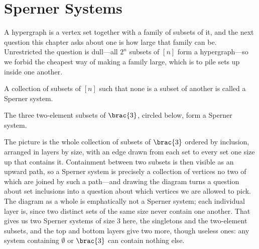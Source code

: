 \section{Sperner Systems}

A hypergraph is a vertex set together with a family of subsets of it, and the next question this chapter asks about one is how large that family can be. Unrestricted the question is dull---all $2^n$ subsets of $[n]$ form a hypergraph---so we forbid the cheapest way of making a family large, which is to pile sets up inside one another.

\begin{boxdefinition}
    A collection of subsets of $[n]$ such that none is a subset of another is called a Sperner system.
\end{boxdefinition}

\begin{boxexample}
    The three two-element subsets of $\brac{3}$, circled below, form a Sperner system.
\end{boxexample}

\begin{figure}[H]
    \centering
\end{figure}

The picture is the whole collection of subsets of $\brac{3}$ ordered by inclusion, arranged in layers by size, with an edge drawn from each set to every set one size up that contains it. Containment between two subsets is then visible as an upward path, so a Sperner system is precisely a collection of vertices no two of which are joined by such a path---and drawing the diagram turns a question about set inclusions into a question about which vertices we are allowed to pick. The diagram as a whole is emphatically not a Sperner system; each individual layer is, since two distinct sets of the same size never contain one another. That gives us two Sperner systems of size $3$ here, the singletons and the two-element subsets, and the top and bottom layers give two more, though useless ones: any system containing $\emptyset$ or $\brac{3}$ can contain nothing else.

